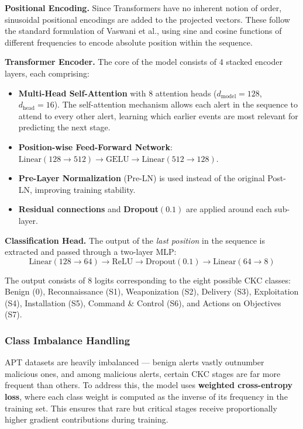 \textbf{Positional Encoding.} Since Transformers have no inherent notion of order, sinusoidal positional encodings are added to the projected vectors. These follow the standard formulation of Vaswani et al., using sine and cosine functions of different frequencies to encode absolute position within the sequence.

\textbf{Transformer Encoder.} The core of the model consists of 4 stacked encoder layers, each comprising:
\begin{itemize}
    \item \textbf{Multi-Head Self-Attention} with 8 attention heads ($d_{\text{model}} = 128$, $d_{\text{head}} = 16$). The self-attention mechanism allows each alert in the sequence to attend to every other alert, learning which earlier events are most relevant for predicting the next stage.
    \item \textbf{Position-wise Feed-Forward Network}: $\text{Linear}(128 \to 512) \to \text{GELU} \to \text{Linear}(512 \to 128)$.
    \item \textbf{Pre-Layer Normalization} (Pre-LN) is used instead of the original Post-LN, improving training stability.
    \item \textbf{Residual connections} and \textbf{Dropout}$(0.1)$ are applied around each sub-layer.
\end{itemize}

\textbf{Classification Head.} The output of the \textit{last position} in the sequence is extracted and passed through a two-layer MLP:
$$\text{Linear}(128 \to 64) \to \text{ReLU} \to \text{Dropout}(0.1) \to \text{Linear}(64 \to 8)$$

The output consists of 8 logits corresponding to the eight possible CKC classes: Benign (0), Reconnaissance (S1), Weaponization (S2), Delivery (S3), Exploitation (S4), Installation (S5), Command \& Control (S6), and Actions on Objectives (S7).

\subsubsection{Class Imbalance Handling}

APT datasets are heavily imbalanced --- benign alerts vastly outnumber malicious ones, and among malicious alerts, certain CKC stages are far more frequent than others. To address this, the model uses \textbf{weighted cross-entropy loss}, where each class weight is computed as the inverse of its frequency in the training set. This ensures that rare but critical stages receive proportionally higher gradient contributions during training.


